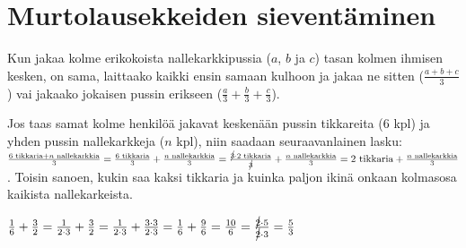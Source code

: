 \chapter{Murtolausekkeiden sieventäminen}


Kun jakaa kolme erikokoista nallekarkkipussia ($a$, $b$ ja $c$) tasan kolmen ihmisen kesken, on sama, laittaako kaikki ensin samaan kulhoon ja jakaa ne sitten ($\frac{a+b+c}{3}$) vai jakaako jokaisen pussin erikseen ($ \frac{a}{3} + \frac{b}{3} + \frac{c}{3}$).

Jos taas samat kolme henkilöä jakavat keskenään pussin tikkareita ($6$ kpl) ja yhden pussin nallekarkkeja ($n$ kpl), niin saadaan seuraavanlainen lasku: $ \frac{6\text{ tikkaria}+n\text{ nallekarkkia}}{3} = \frac{6\text{ tikkaria}}{3} + \frac{n\text{ nallekarkkia}}{3} = \frac{\cancel{3} \cdot 2\text{ tikkaria}}{\cancel{3}} + \frac{n\text{ nallekarkkia}}{3} = 2\text{ tikkaria} + \frac{n\text{ nallekarkkia}}{3}$. Toisin sanoen, kukin saa kaksi tikkaria ja kuinka paljon ikinä onkaan kolmasosa kaikista nallekarkeista.


\begin{esimerkki}

$ \frac{1}{6} + \frac{3}{2} = \frac{1}{2\cdot 3} + \frac{3}{2} = \frac{1}{2 \cdot 3} + \frac{3 \cdot 3}{2 \cdot 3} = \frac{1}{6} + \frac{9}{6} = \frac{10}{6} = \frac{\cancel{2} \cdot 5}{\cancel{2} \cdot 3} = \frac{5}{3}$

\end{esimerkki}

